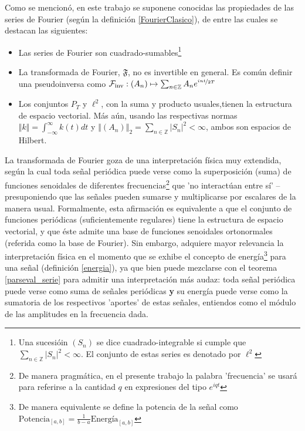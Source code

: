 \documentclass[12pt,a4paper]{mitthesis}
\newcommand{\intR}{\int_{-\infty}^{\infty}}
\newcommand{\abso}[1]{\left| #1 \right|}
\begin{document}
Como se mencion\'o, en este trabajo se suponene conocidas las propiedades de las series de Fourier 
(seg\'un la definici\'on \ref{FourierClasico}), de entre las cuales se destacan las siguientes:
\begin{itemize}
\item Las series de Fourier  son cuadrado-sumables\footnote{Una sucesi\'oin $\left( S_n \right)$ se 
dice cuadrado-integrable si cumple que $\sum_{n\in \mathbb{Z}} \abso{S_n}^{2} < \infty$. El 
conjunto de estas series es denotado por $\ell^{2}$}

\item La transformada de Fourier, $\mathfrak{F}$, no es invertible en general. Es com\'un definir
una pseudoinversa como 
$\mathcal{F}_{\text{inv}} : \left( A_n \right) \mapsto \sum_{n \in \mathbb{Z}} A_n e^{\nicefrac{i n t}{2 T}} $

\item Los conjuntos $P_T$ y $\ell^{2}$, con la suma y producto usuales,tienen la estructura de 
espacio vectorial. M\'as a\'un, usando las respectivas normas $\Vert k \Vert = \intR k(t) dt$ y 
$\left\Vert \left( A_n \right) \right\Vert_2 = \sum_{n\in \mathbb{Z}} \abso{S_n}^{2} < \infty$,
ambos son espacios de Hilbert.
\end{itemize}

La transformada de Fourier goza de una interpretación física muy extendida, seg\'un la cual toda 
se\~nal peri\'odica puede verse como la superposici\'on (suma) de funciones senoidales de 
diferentes frecuencias\footnote{De manera pragm\'atica, en el presente trabajo la palabra 
'frecuencia' se usar\'a para referirse a la cantidad $q$ en expresiones del tipo $e^{i q t}$} que 
'no interact\'uan entre s\'i' --presuponiendo que las se\~nales pueden sumarse y multiplicarse por 
escalares de la manera usual. 
Formalmente, esta afirmaci\'on es equivalente a que el conjunto de funciones peri\'odicas 
(suficientemente regulares) tiene la estructura de espacio vectorial, y que \'este admite una base 
de funciones senoidales ortonormales (referida como la base de Fourier). 
Sin embargo, adquiere mayor relevancia la interpretaci\'on f\'isica en el momento que se exhibe el 
concepto de energ\'ia\footnote{De manera equivalente se define la potencia de la se\~nal como 
$\text{Potencia}_{[a,b]} = \frac{1}{b-a} \text{Energ\'ia}_{[a,b]}$} para una se\~nal (definici\'on 
\ref{energia}), ya que bien puede mezclarse con el teorema \ref{parseval_serie} para admitir una 
interpretaci\'on m\'as audaz: toda se\~nal peri\'odica puede verse como suma de se\~nales 
peri\'odicas \textbf{y} su energ\'ia puede verse como la sumatoria de los respectivos 'aportes' 
de estas se\~nales, entiendos como el m\'odulo de las amplitudes en la frecuencia dada.
\end{document}
